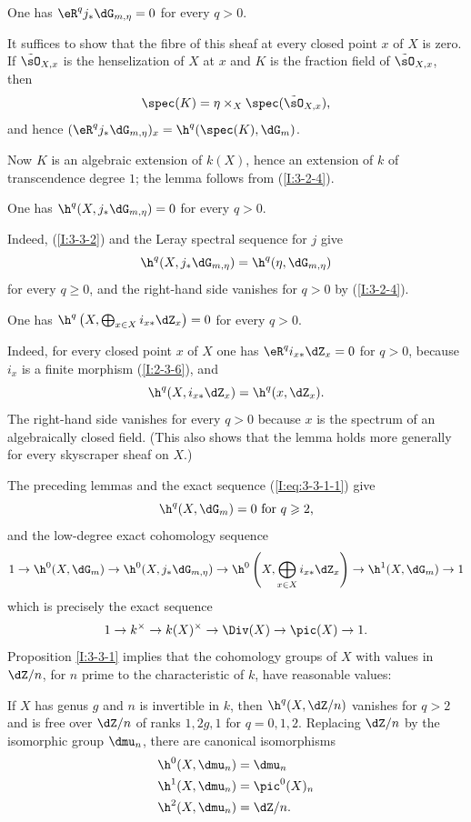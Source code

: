\documentclass[oneside]{book}
\begin{document}
\begin{lemma}\label{I:3-3-2}
One has $\eR^qj_*\dG_{m,\eta}=0$ for every $q>0$.
\end{lemma}

It suffices to show that the fibre of this sheaf at every closed point
$x$ of $X$ is zero. If $\tilde\sO_{X,x}$ is the henselization of $X$ at
$x$ and $K$ is the fraction field of $\tilde\sO_{X,x}$, then
\[
  \spec(K) = \eta\times_X \spec(\tilde\sO_{X,x})\text{,}
\]
and hence $(\eR^qj_*\dG_{m,\eta})_x=\h^q(\spec(K),\dG_m)$.

Now $K$ is an algebraic extension of $k(X)$, hence an extension of $k$
of transcendence degree $1$; the lemma follows from (\ref{I:3-2-4}).

\begin{lemma}\label{I:3-3-3}
One has $\h^q(X,j_*\dG_{m,\eta})=0$ for every $q>0$.
\end{lemma}

Indeed, (\ref{I:3-3-2}) and the Leray spectral sequence for $j$ give
\[
  \h^q(X, j_* \dG_{m,\eta}) = \h^q(\eta,\dG_{m,\eta})
\]
for every $q\geqslant0$, and the right-hand side vanishes for $q>0$ by
(\ref{I:3-2-4}).

\begin{lemma}\label{I:3-3-4}
One has
$\h^q\left(X,\bigoplus_{x\in X}i_{x*}\dZ_x\right)=0$ for every $q>0$.
\end{lemma}

Indeed, for every closed point $x$ of $X$ one has
$\eR^qi_{x*}\dZ_x=0$ for $q>0$, because $i_x$ is a finite morphism
(\ref{I:2-3-6}), and
\[
  \h^q(X,i_{x*}\dZ_x) = \h^q(x,\dZ_x)\text{.}
\]
The right-hand side vanishes for every $q>0$ because $x$ is the spectrum
of an algebraically closed field. (This also shows that the lemma holds
more generally for every skyscraper sheaf on $X$.)

The preceding lemmas and the exact sequence (\ref{I:eq:3-3-1-1}) give
\[
  \h^q(X,\dG_m) = 0 \text{ for $q\geqslant 2$,}
\]
and the low-degree exact cohomology sequence
\[
  1 \to \h^0(X,\dG_m) \to \h^0(X, j_*\dG_{m,\eta}) \to \h^0\left(X,\bigoplus_{x\in X} i_{x*}\dZ_x\right) \to \h^1(X,\dG_m) \to 1
\]
which is precisely the exact sequence
\[
  1 \to k^\times \to k(X)^\times\to \Div(X) \to \pic(X) \to 1\text{.}
\]
Proposition \ref{I:3-3-1} implies that the cohomology groups of $X$ with
values in $\dZ/n$, for $n$ prime to the characteristic of $k$, have
reasonable values:

\begin{corollary}\label{I:3-3-5}
If $X$ has genus $g$ and $n$ is invertible in $k$, then
$\h^q(X,\dZ/n)$ vanishes for $q>2$ and is free over $\dZ/n$ of ranks
$1,2g,1$ for $q=0,1,2$. Replacing $\dZ/n$ by the isomorphic group
$\dmu_n$, there are canonical isomorphisms
\begin{align*}
  \h^0(X,\dmu_n) &= \dmu_n \\
  \h^1(X,\dmu_n) &= \pic^0(X)_n \\
  \h^2(X,\dmu_n) &= \dZ/n \text{.}
\end{align*}
\end{corollary}
\end{document}
